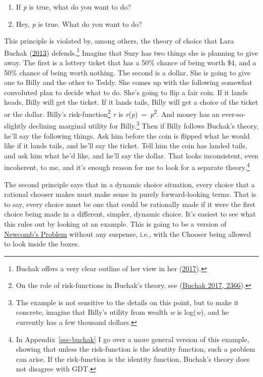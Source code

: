 \documentclass[
  12pt,
  letterpaper,
  DIV=11,
  numbers=noendperiod]{scrreprt}
\providecommand{\tightlist}{%
  \setlength{\itemsep}{0pt}\setlength{\parskip}{0pt}}\usepackage{longtable,booktabs,array}
\begin{document}
\begin{enumerate}
\def\labelenumi{\arabic{enumi}.}
\tightlist
\item
  If \emph{p} is true, what do you want to do?
\item
  Hey, \emph{p} is true. What do you want to do?
\end{enumerate}

This principle is violated by, among others, the theory of choice that
Lara Buchak (\protect\hyperlink{ref-BuchakRisk}{2013})
defends.\footnote{Buchak offers a very clear outline of her view in her
  (\protect\hyperlink{ref-Buchak2017}{2017}).} Imagine that Suzy has two
things she is planning to give away. The first is a lottery ticket that
has a 50\% chance of being worth \$4, and a 50\% chance of being worth
nothing. The second is a dollar. She is going to give one to Billy and
the other to Teddy. She comes up with the following somewhat convoluted
plan to decide what to do. She's going to flip a fair coin. If it lands
heads, Billy will get the ticket. If it lands tails, Billy will get a
choice of the ticket or the dollar. Billy's risk-function\footnote{On
  the role of risk-functions in Buchak's theory, see
  (\protect\hyperlink{ref-Buchak2017}{Buchak 2017, 2366}).} \emph{r} is
\emph{r}(\emph{p})~=~\emph{p}\textsuperscript{2}. And money has an
ever-so-slightly declining marginal utility for Billy.\footnote{The
  example is not sensitive to the details on this point, but to make it
  concrete, imagine that Billy's utility from wealth \emph{w} is
  log(\emph{w}), and he currently has a few thousand dollars.} Then if
Billy follows Buchak's theory, he'll say the following things. Ask him
before the coin is flipped what he would like if it lands tails, and
he'll say the ticket. Tell him the coin has landed tails, and ask him
what he'd like, and he'll say the dollar. That looks inconsistent, even
incoherent, to me, and it's enough reason for me to look for a separate
theory.\footnote{In Appendix~\ref{sec-buchak} I go over a more general
  version of this example, showing that unless the risk-function is the
  identity function, such a problem can arise. If the risk-function is
  the identity function, Buchak's theory does not disagree with GDT.}

The second principle says that in a dynamic choice situation, every
choice that a rational chooser makes must make sense in purely
forward-looking terms. That is to say, every choice must be one that
could be rationally made if it were the first choice being made in a
different, simpler, dynamic choice. It's easiest to see what this rules
out by looking at an example. This is going to be a version of
\protect\hyperlink{tbl-newcomb}{Newcomb's Problem} without any suspense,
i.e., with the Chooser being allowed to look inside the boxes.
\end{document}
